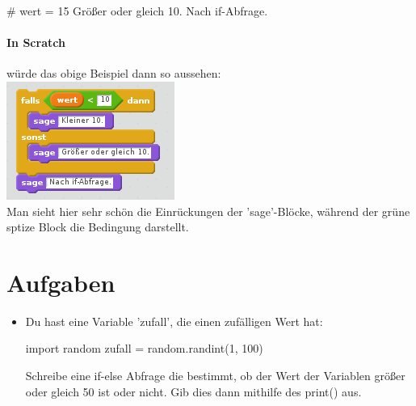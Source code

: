 \documentclass{\VorlagenPfad/coderdojokatext}
\begin{document}
\begin{pseudocode}
# wert = 15
Größer oder gleich 10.
Nach if-Abfrage.
\end{pseudocode}

\paragraph{In Scratch} würde das obige Beispiel dann so aussehen:
\\
\includegraphics[scale=1]{scratch_if_else}
\\
Man sieht hier sehr schön die Einrückungen der 'sage'-Blöcke, während der grüne sptize Block die Bedingung darstellt.


\section{Aufgaben}
\begin{itemize}
	\item Du hast eine Variable 'zufall', die einen zufälligen Wert hat:
	\begin{pythoncode}
import random
zufall = random.randint(1, 100)
	\end{pythoncode}
	Schreibe eine if-else Abfrage die bestimmt, ob der Wert der Variablen größer oder gleich 50 ist oder nicht. Gib dies dann mithilfe des print() aus.
\end{itemize}
\end{document}
